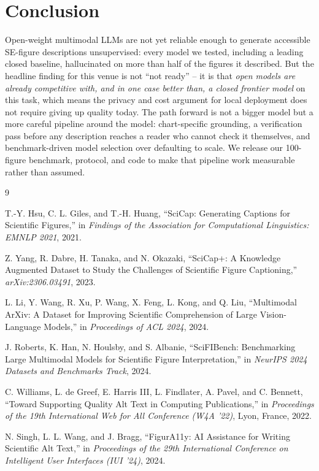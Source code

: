 \documentclass[10pt,conference]{IEEEtran}
\begin{document}
\section{Conclusion}

Open-weight multimodal LLMs are not yet reliable enough to generate accessible SE-figure descriptions unsupervised: every model we tested, including a leading closed baseline, hallucinated on more than half of the figures it described. But the headline finding for this venue is not ``not ready'' -- it is that \emph{open models are already competitive with, and in one case better than, a closed frontier model} on this task, which means the privacy and cost argument for local deployment does not require giving up quality today. The path forward is not a bigger model but a more careful pipeline around the model: chart-specific grounding, a verification pass before any description reaches a reader who cannot check it themselves, and benchmark-driven model selection over defaulting to scale. We release our 100-figure benchmark, protocol, and code to make that pipeline work measurable rather than assumed.


\begin{thebibliography}{9}

 T.-Y. Hsu, C. L. Giles, and T.-H. Huang, ``SciCap: Generating Captions for Scientific Figures,'' in \textit{Findings of the Association for Computational Linguistics: EMNLP 2021}, 2021.

 Z. Yang, R. Dabre, H. Tanaka, and N. Okazaki, ``SciCap+: A Knowledge Augmented Dataset to Study the Challenges of Scientific Figure Captioning,'' \textit{arXiv:2306.03491}, 2023.

 L. Li, Y. Wang, R. Xu, P. Wang, X. Feng, L. Kong, and Q. Liu, ``Multimodal ArXiv: A Dataset for Improving Scientific Comprehension of Large Vision-Language Models,'' in \textit{Proceedings of ACL 2024}, 2024.

 J. Roberts, K. Han, N. Houlsby, and S. Albanie, ``SciFIBench: Benchmarking Large Multimodal Models for Scientific Figure Interpretation,'' in \textit{NeurIPS 2024 Datasets and Benchmarks Track}, 2024.

 C. Williams, L. de Greef, E. Harris III, L. Findlater, A. Pavel, and C. Bennett, ``Toward Supporting Quality Alt Text in Computing Publications,'' in \textit{Proceedings of the 19th International Web for All Conference (W4A '22)}, Lyon, France, 2022.

 N. Singh, L. L. Wang, and J. Bragg, ``FigurA11y: AI Assistance for Writing Scientific Alt Text,'' in \textit{Proceedings of the 29th International Conference on Intelligent User Interfaces (IUI '24)}, 2024.

\end{thebibliography}
\end{document}
